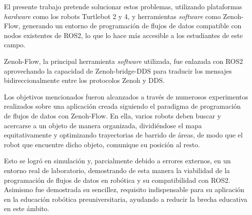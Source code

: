 El presente trabajo pretende solucionar estos problemas, utilizando plataformas
\textit{hardware} como los robots Turtlebot 2 y 4, y herramientas
\textit{software} como Zenoh-Flow, generando un entorno de programación de
flujos de datos compatible con nodos existentes de ROS2, lo que lo hace más
accesible a los estudiantes de este campo.

Zenoh-Flow, la principal herramienta \textit{software} utilizada, fue enlazada
con ROS2 aprovechando la capacidad de Zenoh-bridge-DDS para traducir los
mensajes bidireccionalmente entre los protocolos Zenoh y DDS.

Los objetivos mencionados fueron alcanzados a través de numerosos experimentos
realizados sobre una aplicación creada siguiendo el paradigma de programación de
flujos de datos con Zenoh-Flow.
En ella, varios robots deben buscar y acercarse a un objeto de manera
organizada, dividiéndose el mapa equitativamente y optimizando trayectorias de
barrido de áreas, de modo que el robot que encuentre dicho objeto, comunique su
posición al resto.

Esto se logró en simulación y, parcialmente debido a errores externos, en un
entorno real de laboratorio, demostrando de esta manera la viabilidad de la
programación de flujos de datos en robótica y su compatibilidad con ROS2.
Asimismo fue demostrada su sencillez, requisito indispensable para su aplicación
en la educación robótica preuniversitaria, ayudando a reducir la brecha
educativa en este ámbito.
